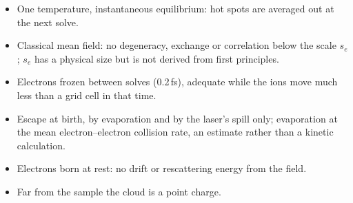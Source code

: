 \begin{itemize}
  \item One temperature, instantaneous equilibrium: hot spots are averaged out at the next solve.
  \item Classical mean field: no degeneracy, exchange or correlation below the scale $s_e$; $s_e$ has a physical size
    but is not derived from first principles.
  \item Electrons frozen between solves (0.2\,fs), adequate while the ions move much less than a grid cell in that
    time.
  \item Escape at birth, by evaporation and by the laser's spill only; evaporation at the mean electron--electron
    collision rate, an estimate rather than a kinetic calculation.
  \item Electrons born at rest: no drift or rescattering energy from the field.
  \item Far from the sample the cloud is a point charge.
\end{itemize}
